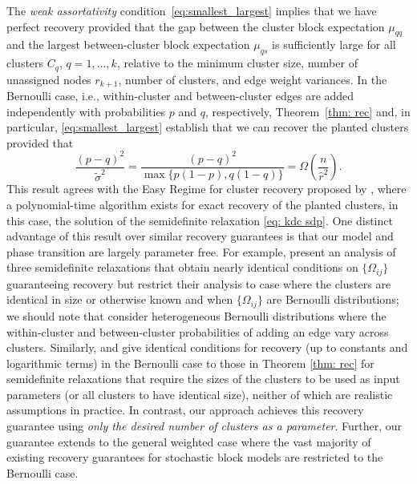 \documentclass[twoside,11pt]{article}
\newcommand{\0}{\bs{0}}
\newcommand{\rbra}[1]{\ensuremath{\left( #1 \right)}} %
\begin{document}
{The \emph{weak assortativity} condition~\eqref{eq:smallest_largest} implies that we have perfect recovery provided that the gap between the cluster block expectation $\mu_{qq}$ and the largest between-cluster block expectation $\mu_{qs}$ is sufficiently large for all clusters $C_q$, $q=1,\dots, k$, relative to the minimum cluster size, number of unassigned nodes $r_{k+1}$, number of clusters,  and edge weight variances.
In the %
Bernoulli case, i.e., within-cluster and between-cluster edges are added independently with probabilities $p$ and $q$, respectively, Theorem~\ref{thm: rec} and, in particular,
\eqref{eq:smallest_largest} establish that we can recover the planted
clusters provided that
\[
	\frac{(p-q)^2}{\tilde\sigma^2} = \frac{(p-q)^2}{\max\{p(1-p), q(1-q)\}} = \Omega\rbra{ \frac{ n }{\hat r^2}}.
\]
This result agrees with the Easy Regime for cluster recovery
proposed by \cite{chen2014statistical}, where a polynomial-time
algorithm exists for exact recovery of the planted clusters, in this case, the solution of the semidefinite relaxation \eqref{eq: kdc sdp}.
One distinct advantage of this result over similar recovery guarantees
is that our model and phase transition are largely parameter free.
For example, \citet{amini2014semidefinite} present an analysis of three
semidefinite relaxations that obtain nearly identical conditions
on $\{\Omega_{ij}\}$ guaranteeing recovery but restrict their
analysis to case where the clusters are identical in size
or otherwise known and when $\{\Omega_{ij}\}$ are Bernoulli distributions; we should note that
\citet{amini2014semidefinite} consider heterogeneous Bernoulli
distributions where the within-cluster and between-cluster probabilities
of adding an edge vary across clusters.
Similarly, \citet{chen2014statistical} and \citet{jalali2015relative} give identical
conditions for recovery
(up to constants and logarithmic terms)
in the Bernoulli case
to those in Theorem \eqref{thm: rec} for
semidefinite relaxations that require the sizes of the clusters to
be used as input parameters (or all clusters to have identical size), neither
of which are realistic assumptions in practice.
In contrast, our approach achieves this recovery guarantee
using \emph{only the desired number of clusters as a parameter}.
Further, our guarantee extends to the general weighted case where
the vast majority of existing recovery guarantees for stochastic
block models are restricted to the Bernoulli case.

}
\end{document}
